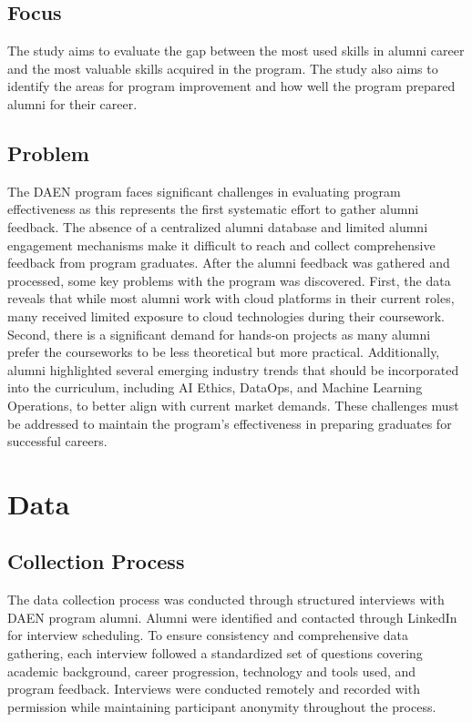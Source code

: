 \documentclass[12pt,a4paper]{article}
\begin{document}
\subsection{Focus}
The study aims to evaluate the gap between the most used skills in alumni career and the most valuable skills acquired in the program. The study also aims to identify the areas for program improvement and how well the program prepared alumni for their career.

\subsection{Problem}
The DAEN program faces significant challenges in evaluating program effectiveness as this represents the first systematic effort to gather alumni feedback. The absence of a centralized alumni database and limited alumni engagement mechanisms make it difficult to reach and collect comprehensive feedback from program graduates. After the alumni feedback was gathered and processed, some key problems with the program was discovered. First, the data reveals that while most alumni work with cloud platforms in their current roles, many received limited exposure to cloud technologies during their coursework. Second, there is a significant demand for hands-on projects as many alumni prefer the courseworks to be less theoretical but more practical. Additionally, alumni highlighted several emerging industry trends that should be incorporated into the curriculum, including AI Ethics, DataOps, and Machine Learning Operations, to better align with current market demands. These challenges must be addressed to maintain the program's effectiveness in preparing graduates for successful careers.

\section{Data}
\subsection{Collection Process}
The data collection process was conducted through structured interviews with DAEN program alumni. Alumni were identified and contacted through LinkedIn for interview scheduling. To ensure consistency and comprehensive data gathering, each interview followed a standardized set of questions covering academic background, career progression, technology and tools used, and program feedback. Interviews were conducted remotely and recorded with permission while maintaining participant anonymity throughout the process.
\end{document}
